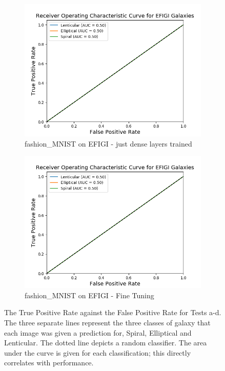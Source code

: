 \documentclass[12pt, onecolumn]{aa}
\begin{document}
\begin{figure}[t!]
\begin{subfigure}[t]{0.5\linewidth}
    \includegraphics[width=\linewidth]{Figures/Results_ROC's/F_on_E_JD.png} 
    \caption{ fashion\_MNIST on EFIGI - just dense layers trained} \label{fig:f_on_e_JD}
  \end{subfigure} 
  \begin{subfigure}[t]{0.5\linewidth}
    \includegraphics[width=\linewidth]{Figures/Results_ROC's/F_on_E_FTpng.png} 
    \caption{ fashion\_MNIST on EFIGI - Fine Tuning} \label{fig:f_on_e_FC}
  \end{subfigure}
  \caption{The True Positive Rate against the False Positive Rate for Tests a-d. The three separate lines represent the three classes of galaxy that each image was given a prediction for, Spiral, Elliptical and Lenticular. The dotted line depicts a random classifier. The area under the curve is given for each classification; this directly correlates with performance.}
  \label{fig:roccurves1}
\end{figure}
\end{document}

